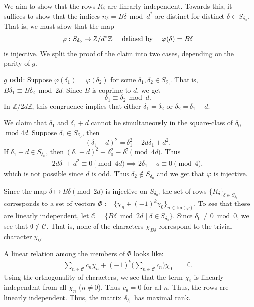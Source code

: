 \documentclass[11pt]{amsart}
\numberwithin{equation}{section}
\newcommand{\mc}{\mathcal}
\renewcommand*{\mod}{\operatorname{mod}}
\newcommand{\q}{\quad}
\newcommand{\sumn}{\sum \nolimits}
\begin{document}
We aim to show that the rows $R_\delta$ are linearly independent. Towards this, it suffices to show that the indices $n_\delta = B\delta \bmod{d^*}$ are distinct for distinct $\delta \in S_{\delta_{0}}$. That is, we must show that the map 
\[ \varphi: S_{\delta_{0}} \to \mathbb{Z}/d^*\mathbb{Z} \text{  \q defined by \q  } \varphi(\delta) = B\delta\] 
is injective. We split the proof of the claim into two cases, depending on the parity of $g$. 

\textbf{$g$ odd}:
Suppose $\varphi(\delta_1) = \varphi(\delta_2)$ for some $\delta_1, \delta_2 \in S_{\delta_{0}}$. That is,
$B \delta_1 \equiv B \delta_2 \bmod{2d}.$ Since $B$ is coprime to $d$, we get
\[
\delta_1 \equiv \delta_2 \bmod d.
\]
In $\mathbb{Z}/2d\mathbb{Z}$, this congruence implies that either $\delta_1 = \delta_2$ or $\delta_2 = \delta_1 + d$.

We claim that $\delta_1$ and $\delta_1 + d$ cannot be simultaneously in the square-class of $\delta_0$ $\mod 4d$.  Suppose $\delta_1 \in S_{\delta_0}$, then
\[
(\delta_1 + d)^2 = \delta_1^2 + 2d\delta_1 + d^2.
\]
If $\delta_1 + d\in S_{\delta_0}$, then $(\delta_1 + d)^2 \equiv \delta_0^2\equiv\delta_1^2 \pmod{4d}$. Thus
\begin{align}
2d\delta_1 + d^2 \equiv 0 \pmod{4d}\implies 2\delta_1 + d \equiv 0 \pmod 4,
\end{align}
which is not possible since $d$ is odd. Thus $\delta_2\not\in S_{\delta_0}$ and we get that $\varphi$ is injective.

Since the map $\delta \mapsto B\delta \pmod{2d}$ is injective on $S_{\delta_0}$,  the set of rows $\{R_\delta\}_{\delta \in S_{\delta_0}}$ corresponds to a set of vectors $\Phi:=\{ \chi_{n} +(-1)^k \chi_0 \}_{n \in \text{Im}(\varphi)}$. To see that these are linearly independent, let $\mc C= \{ B\delta \bmod{2d} \mid \delta \in S_{\delta_0} \}$. Since $\delta_0\neq 0\bmod 0$, we see that $0\not\in \mc C$. That is, none of the characters $\chi_{B\delta}$ correspond to the trivial character $\chi_0$.

A linear relation among  the members of $\Phi$ looks like: 
\begin{align}
\sumn_{n \in \mc C} c_n \chi_n + (-1)^k \big( \sumn_{n \in \mc C} c_n \big) \chi_0 &= 0.
\end{align}
Using the orthogonality of characters, we see that the term $\chi_0$ is linearly independent from all $\chi_n$ ($n \neq 0$). Thus $c_n = 0$ for all $n$. Thus, the rows are linearly independent. Thus, the matrix $\mc S_{\delta_0}$ has maximal rank.
\end{document}

